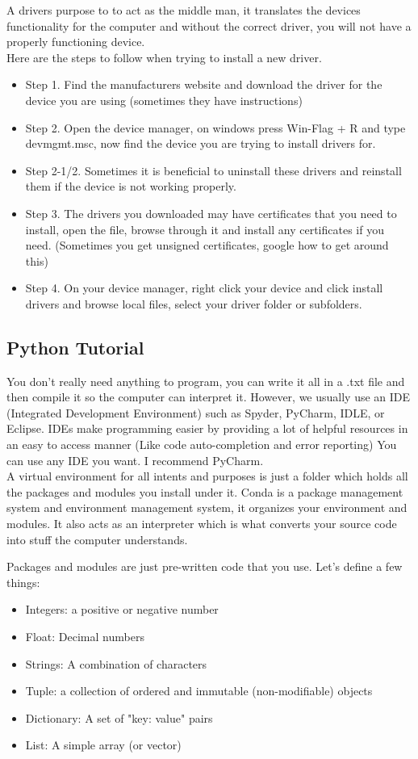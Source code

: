 \documentclass{article}
\begin{document}
A drivers purpose to to act as the middle man, it translates the devices functionality for the computer and without the correct driver, you will not have a properly functioning device.
\\
Here are the steps to follow when trying to install a new driver.
\begin{itemize}
    \item Step 1. Find the manufacturers website and download the driver for the device you are using (sometimes they have instructions)
    \item Step 2. Open the device manager, on windows press Win-Flag + R and type devmgmt.msc, now find the device you are trying to install drivers for.
    \item Step 2-1/2. Sometimes it is beneficial to uninstall these drivers and reinstall them if the device is not working properly.
    \item Step 3. The drivers you downloaded may have certificates that you need to install, open the file, browse through it and install any certificates if you need. (Sometimes you get unsigned certificates, google how to get around this)
    \item Step 4. On your device manager, right click your device and click install drivers and browse local files, select your driver folder or subfolders.
\end{itemize}


\subsection{Python Tutorial}
You don't really need anything to program, you can write it all in a .txt file and then compile it so the computer can interpret it. However, we usually use an IDE (Integrated Development Environment) such as Spyder, PyCharm, IDLE, or Eclipse. 
IDEs make programming easier by providing a lot of helpful resources in an easy to access manner (Like code auto-completion and error reporting)
You can use any IDE you want. I recommend PyCharm.\\

A virtual environment for all intents and purposes is just a folder which holds all the packages and modules you install under it. Conda is a package management system and environment management system, it organizes your environment and modules.
It also acts as an interpreter which is what converts your source code into stuff the computer understands.

Packages and modules are just pre-written code that you use.
Let's define a few things:
\begin{itemize}
    \item Integers: a positive or negative number
    \item Float: Decimal numbers
    \item Strings: A combination of characters
    \item Tuple: a collection of ordered and immutable (non-modifiable) objects
    \item Dictionary: A set of "key: value" pairs
    \item List: A simple array (or vector)
\end{itemize}
\end{document}
